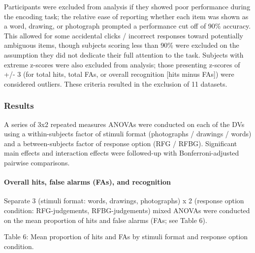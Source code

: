 \documentclass[
  11pt,
]{article}
\begin{document}
Participants were excluded from analysis if they showed poor performance
during the encoding task; the relative ease of reporting whether each
item was shown as a word, drawing, or photograph prompted a performance
cut off of 90\% accuracy. This allowed for some accidental clicks /
incorrect responses toward potentially ambiguous items, though subjects
scoring less than 90\% were excluded on the assumption they did not
dedicate their full attention to the task. Subjects with extreme
z-scores were also excluded from analysis; those presenting z-scores of
+/- 3 (for total hits, total FAs, or overall recognition {[}hits minus
FAs{]}) were considered outliers. These criteria resulted in the
exclusion of 11 datasets.

\hypertarget{results-2}{%
\subsubsection{Results}\label{results-2}}

A series of 3x2 repeated measures ANOVAs were conducted on each of the
DVs using a within-subjects factor of stimuli format (photographs /
drawings / words) and a between-subjects factor of response option (RFG
/ RFBG). Significant main effects and interaction effects were
followed-up with Bonferroni-adjusted pairwise comparisons.

\hypertarget{overall-hits-false-alarms-fas-and-recognition}{%
\paragraph{Overall hits, false alarms (FAs), and
recognition}\label{overall-hits-false-alarms-fas-and-recognition}}

Separate 3 (stimuli format: words, drawings, photographs) x 2 (response
option condition: RFG-judgements, RFBG-judgements) mixed ANOVAs were
conducted on the mean proportion of hits and false alarms (FAs; see
Table 6).

\newpage

Table 6: Mean proportion of hits and FAs by stimuli format and response
option condition.
\end{document}
